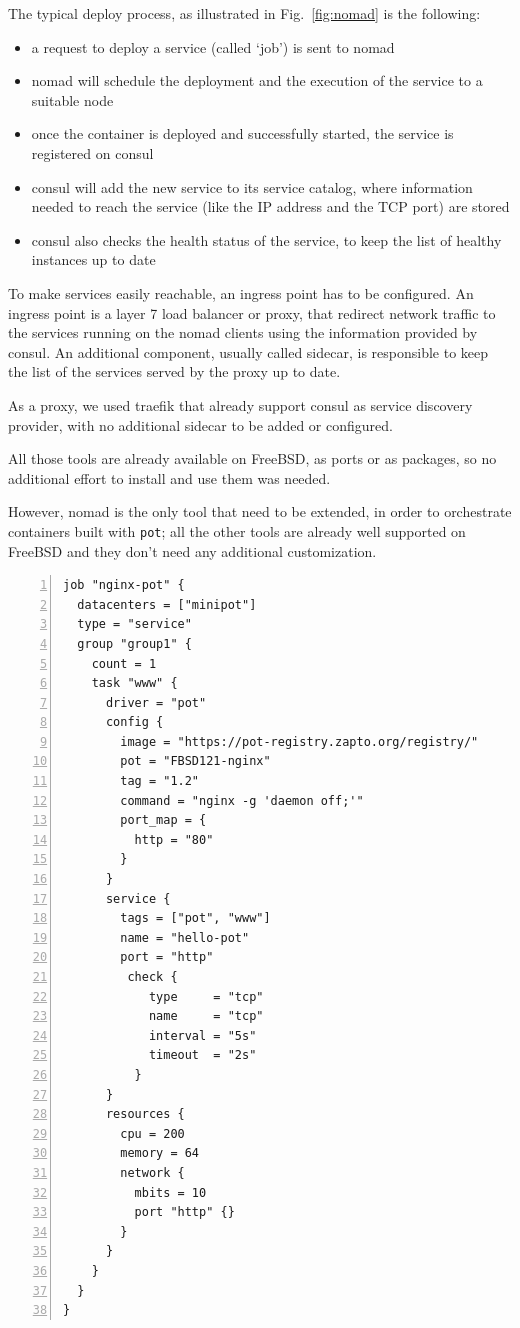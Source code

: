 \documentclass[conference,a4paper,11pt]{IEEEtran}
\begin{document}
The typical deploy process, as illustrated in Fig.~\ref{fig:nomad} is the following:
\begin{itemize}
	\item a request to deploy a service (called ‘job’) is sent to nomad
	\item nomad will schedule the deployment and the execution of the service to a suitable node
	\item once the container is deployed and successfully started, the service is registered on consul
	\item consul will add the new service to its service catalog, where information needed to reach the service (like the IP address and the TCP port) are stored
	\item consul also checks the health status of the service, to keep the list of healthy instances up to date
\end{itemize}

To make services easily reachable, an ingress point has to be configured. An ingress point is a layer 7 load balancer or proxy, that redirect network traffic to the services running on the nomad clients using the information provided by consul. An additional component, usually called sidecar, is responsible to keep the list of the services served by the proxy up to date.

As a proxy, we used traefik that already support consul as service discovery provider, with no additional sidecar to be added or configured.

All those tools are already available on FreeBSD, as ports or as packages, so no additional effort to install and use them was needed.

However, nomad is the only tool that need to be extended, in order to orchestrate containers built with \texttt{pot}; all the other tools are already well supported on FreeBSD and they don’t need any additional customization.

\begin{lstlisting}[float=*, backgroundcolor=\color{listing-bg},numbers=left,label=list:nomad,caption={An example of a nomad job}]
job "nginx-pot" {
  datacenters = ["minipot"]
  type = "service"
  group "group1" {
    count = 1 
    task "www" {
      driver = "pot"
      config {
        image = "https://pot-registry.zapto.org/registry/"
        pot = "FBSD121-nginx"
        tag = "1.2"
        command = "nginx -g 'daemon off;'"
        port_map = {
          http = "80"
        }
      }
      service {
        tags = ["pot", "www"]
        name = "hello-pot"
        port = "http"
         check {
            type     = "tcp"
            name     = "tcp"
            interval = "5s"
            timeout  = "2s"
          }
      }
      resources {
        cpu = 200
        memory = 64
        network {
          mbits = 10
          port "http" {}
        }
      }
    }
  }
}
\end{lstlisting}
\end{document}
